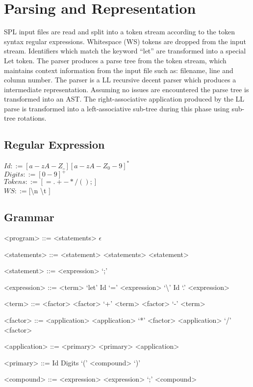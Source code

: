 \documentclass{article}
\begin{document}
\section{Parsing and Representation}

SPL input files are read and split into a token stream according to the token
syntax regular expressions. Whitespace (WS) tokens are dropped from the input
stream. Identifiers which match the keyword ``let'' are transformed into a 
special Let token. The parser produces a parse tree from the token stream,
which maintains context information from the input file such as: filename, line
and column number. The parser is a LL recursive decent parser which produces a 
intermediate representation. Assuming no issues are encountered the parse
tree is transformed into an AST. The right-associative application produced by
the LL parse is transformed into a left-associative sub-tree during this phase
using sub-tree rotations.

\subsection{Regular Expression}

$Id ::= [a-zA-Z\_][a-zA-Z_0-9]^{*}$\\
$Digits ::= [0-9]^{+}$\\
$Tokens ::= [=.+-*/();]$\\
$WS ::= [$\textbackslash n \textbackslash t $]$

\subsection{Grammar}

\begin{grammar}
<program> ::= <statements>
   \alt $\epsilon$ 

<statements> ::= <statement> <statements>
   \alt <statement>

<statement> ::= <expression> `;'
              
<expression> ::= <term>
   \alt `let' Id `=' <expression>
   \alt `\textbackslash' Id `.' <expression>

<term> ::= <factor>
   \alt <factor> `+' <term>
   \alt <factor> `-' <term>

<factor> ::= <application>
   \alt <application> `*' <factor>
   \alt <application> `/' <factor>

<application> ::= <primary>
   \alt <primary> <application>

<primary> ::= Id
   \alt Digits
   \alt `(' <compound> `)'

<compound> ::= <expression>
   \alt <expression> `;' <compound>
\end{grammar}
\end{document}
